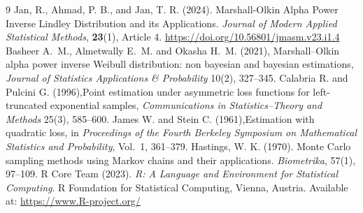 \documentclass[twoside]{article}
\begin{document}

\begin{thebibliography}{9}
 Jan, R., Ahmad, P. B., and Jan, T. R. (2024). Marshall-Olkin Alpha Power Inverse Lindley Distribution and its Applications. \textit{Journal of Modern Applied Statistical Methods}, \textbf{23}(1), Article 4. \url{https://doi.org/10.56801/jmasm.v23.i1.4}
Basheer A.~M., Almetwally E.~M. and Okasha H.~M. (2021),
Marshall--Olkin alpha power inverse Weibull distribution: non bayesian and bayesian estimations,
{\it Journal of Statistics Applications \& Probability} 10(2), 327--345.
Calabria R. and Pulcini G. (1996),Point estimation under asymmetric loss functions for left-truncated exponential samples,
{\it Communications in Statistics--Theory and Methods} 25(3), 585--600.
James W. and Stein C. (1961),Estimation with quadratic loss,
in {\it Proceedings of the Fourth Berkeley Symposium on Mathematical Statistics and Probability},
Vol.~1, 361--379.
 Hastings, W. K. (1970). Monte Carlo sampling methods using Markov chains and their applications. {\it Biometrika}, 57(1), 97–109. 
 R Core Team (2023). \textit{R: A Language and Environment for Statistical Computing}. R Foundation for Statistical Computing, Vienna, Austria. Available at: \url{https://www.R-project.org/}
\end{thebibliography}
\end{document}

